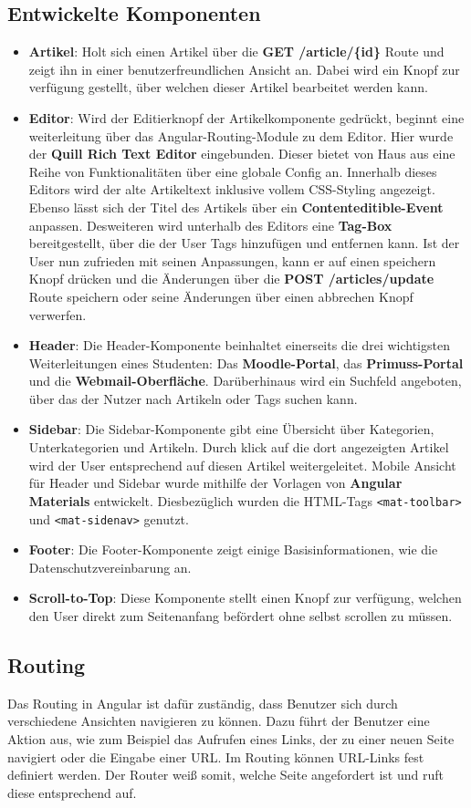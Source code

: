 \subsection{Entwickelte Komponenten}
\begin{itemize}
\item \textbf{Artikel}: Holt sich einen Artikel über die \textbf{GET /article/\{id\}} Route und zeigt ihn in einer benutzerfreundlichen Ansicht an. Dabei wird ein Knopf zur verfügung gestellt, über welchen dieser Artikel bearbeitet werden kann.
\item \textbf{Editor}: Wird der Editierknopf der Artikelkomponente gedrückt, beginnt eine weiterleitung über das Angular-Routing-Module zu dem Editor. Hier wurde der \textbf{Quill Rich Text Editor} eingebunden. Dieser bietet von Haus aus eine Reihe von Funktionalitäten über eine globale Config an. Innerhalb dieses Editors wird der alte Artikeltext inklusive vollem CSS-Styling angezeigt. Ebenso lässt sich der Titel des Artikels über ein \textbf{Contenteditible-Event} anpassen. Desweiteren wird unterhalb des Editors eine \textbf{Tag-Box} bereitgestellt, über die der User Tags hinzufügen und entfernen kann. Ist der User nun zufrieden mit seinen Anpassungen, kann er auf einen speichern Knopf drücken und die Änderungen über die \textbf{POST /articles/update} Route speichern oder seine Änderungen über einen abbrechen Knopf verwerfen.
\item \textbf{Header}: Die Header-Komponente beinhaltet einerseits die drei wichtigsten Weiterleitungen eines Studenten: Das \textbf{Moodle-Portal}, das \textbf{Primuss-Portal} und die \textbf{Webmail-Oberfläche}. Darüberhinaus wird ein Suchfeld angeboten, über das der Nutzer nach Artikeln oder Tags suchen kann.
\item \textbf{Sidebar}: Die Sidebar-Komponente gibt eine Übersicht über Kategorien, Unterkategorien und Artikeln. Durch klick auf die dort angezeigten Artikel wird der User entsprechend auf diesen Artikel weitergeleitet. 
\rightarrow Mobile Ansicht für Header und Sidebar wurde mithilfe der Vorlagen von \textbf{Angular Materials} entwickelt. Diesbezüglich wurden die HTML-Tags \texttt{<mat-toolbar>} und \texttt{<mat-sidenav>} genutzt.
\item \textbf{Footer}: Die Footer-Komponente zeigt einige Basisinformationen, wie die Datenschutzvereinbarung an. 
\item \textbf{Scroll-to-Top}: Diese Komponente stellt einen Knopf zur verfügung, welchen den User direkt zum Seitenanfang befördert ohne selbst scrollen zu müssen. 
\end{itemize}

\subsection{Routing}
Das Routing in Angular ist dafür zuständig, dass Benutzer sich durch verschiedene Ansichten navigieren zu können. Dazu führt der Benutzer eine Aktion aus, wie zum Beispiel das Aufrufen eines Links, der zu einer neuen Seite navigiert oder die Eingabe einer URL. Im Routing können URL-Links fest definiert werden. Der Router weiß somit, welche Seite angefordert ist und ruft diese entsprechend auf.


